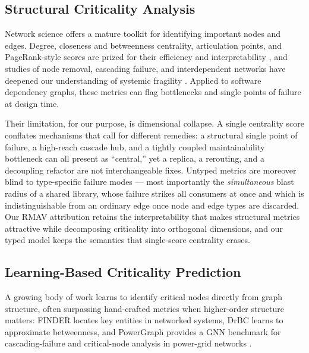 \documentclass[review]{elsarticle}
\begin{document}
\subsection{Structural Criticality Analysis}

Network science offers a mature toolkit for identifying important nodes and edges. Degree, closeness
and betweenness centrality, articulation points, and PageRank-style scores are prized for their
efficiency and interpretability \cite{Freeman1977,BrinPage1998}, and studies of node removal,
cascading failure, and interdependent networks have deepened our understanding of systemic fragility
\cite{Buldyrev2010}. Applied to software dependency graphs, these metrics can flag bottlenecks and
single points of failure at design time.

Their limitation, for our purpose, is dimensional collapse. A single centrality score conflates
mechanisms that call for different remedies: a structural single point of failure, a high-reach
cascade hub, and a tightly coupled maintainability bottleneck can all present as ``central,'' yet a
replica, a rerouting, and a decoupling refactor are not interchangeable fixes. Untyped metrics are
moreover blind to type-specific failure modes --- most importantly the \emph{simultaneous} blast
radius of a shared library, whose failure strikes all consumers at once and which is
indistinguishable from an ordinary edge once node and edge types are discarded. Our RMAV attribution
retains the interpretability that makes structural metrics attractive while decomposing criticality
into orthogonal dimensions, and our typed model keeps the semantics that single-score centrality
erases.

\subsection{Learning-Based Criticality Prediction}

A growing body of work learns to identify critical nodes directly from graph structure, often
surpassing hand-crafted metrics when higher-order structure matters: FINDER locates key entities in
networked systems, DrBC learns to approximate betweenness, and PowerGraph provides a GNN benchmark
for cascading-failure and critical-node analysis in power-grid networks
\cite{Fan2020Nature,Fan2019CIKM,Varbella2024PowerGraph}.
\end{document}
